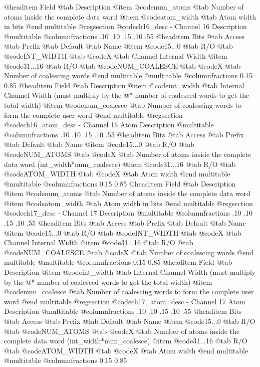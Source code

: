 @headitem Field @tab Description
@item @code{num_atoms} @tab Number of atoms inside the complete data word
@item @code{atom_width} @tab Atom width in bits
@end multitable
@regsection @code{ch16_desc} - Channel 16 Description
@multitable @columnfractions .10 .10 .15 .10 .55
@headitem Bits @tab Access @tab Prefix @tab Default @tab Name
@item @code{15...0}
@tab R/O @tab
@code{INT_WIDTH}
@tab @code{X} @tab 
Channel Internal Width
@item @code{31...16}
@tab R/O @tab
@code{NUM_COALESCE}
@tab @code{X} @tab 
Number of coalescing words
@end multitable
@multitable @columnfractions 0.15 0.85
@headitem Field @tab Description
@item @code{int_width} @tab Internal Channel Width (must multiply by the @* number of coalesced words to get the total width)
@item @code{num_coalesce} @tab Number of coalescing words to form the complete user word
@end multitable
@regsection @code{ch16_atom_desc} - Channel 16 Atom Description
@multitable @columnfractions .10 .10 .15 .10 .55
@headitem Bits @tab Access @tab Prefix @tab Default @tab Name
@item @code{15...0}
@tab R/O @tab
@code{NUM_ATOMS}
@tab @code{X} @tab 
Number of atoms inside the complete data word (int_width*num_coalesce)
@item @code{31...16}
@tab R/O @tab
@code{ATOM_WIDTH}
@tab @code{X} @tab 
Atom width
@end multitable
@multitable @columnfractions 0.15 0.85
@headitem Field @tab Description
@item @code{num_atoms} @tab Number of atoms inside the complete data word
@item @code{atom_width} @tab Atom width in bits
@end multitable
@regsection @code{ch17_desc} - Channel 17 Description
@multitable @columnfractions .10 .10 .15 .10 .55
@headitem Bits @tab Access @tab Prefix @tab Default @tab Name
@item @code{15...0}
@tab R/O @tab
@code{INT_WIDTH}
@tab @code{X} @tab 
Channel Internal Width
@item @code{31...16}
@tab R/O @tab
@code{NUM_COALESCE}
@tab @code{X} @tab 
Number of coalescing words
@end multitable
@multitable @columnfractions 0.15 0.85
@headitem Field @tab Description
@item @code{int_width} @tab Internal Channel Width (must multiply by the @* number of coalesced words to get the total width)
@item @code{num_coalesce} @tab Number of coalescing words to form the complete user word
@end multitable
@regsection @code{ch17_atom_desc} - Channel 17 Atom Description
@multitable @columnfractions .10 .10 .15 .10 .55
@headitem Bits @tab Access @tab Prefix @tab Default @tab Name
@item @code{15...0}
@tab R/O @tab
@code{NUM_ATOMS}
@tab @code{X} @tab 
Number of atoms inside the complete data word (int_width*num_coalesce)
@item @code{31...16}
@tab R/O @tab
@code{ATOM_WIDTH}
@tab @code{X} @tab 
Atom width
@end multitable
@multitable @columnfractions 0.15 0.85

